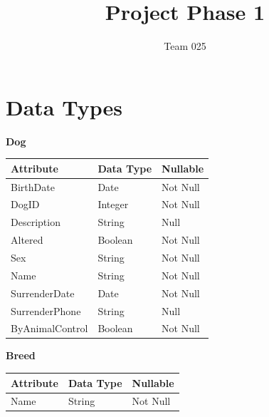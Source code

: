 \documentclass{article}
\title{Project Phase 1}
\author{Team 025}
\begin{document}
\maketitle
\tableofcontents
\newpage

\section{Data Types}

\noindent\textbf{Dog}
\begin{table}[H]
    \begin{tabular}{|l|l|l|}
    \hline
    \textbf{Attribute}         & \textbf{Data Type}                  & \textbf{Nullable} \\ \hline
    BirthDate                  & Date                                & Not Null          \\ \hline
    DogID                      & Integer                             & Not Null          \\ \hline
    Description                & String                              & Null              \\ \hline
    Altered                    & Boolean                             & Not Null          \\ \hline
    Sex                        & String                              & Not Null          \\ \hline
    Name                       & String                              & Not Null          \\ \hline
    SurrenderDate              & Date                                & Not Null          \\ \hline
    SurrenderPhone             & String                              & Null              \\ \hline
    ByAnimalControl            & Boolean                             & Not Null          \\ \hline
    \end{tabular}
\end{table}

\noindent \textbf{Breed}
\begin{table}[H]
    \begin{tabular}{|l|l|l|}
    \hline
    \textbf{Attribute}        & \textbf{Data Type} & \textbf{Nullable} \\ \hline
    Name                      & String             & Not Null          \\ \hline
    \end{tabular}
\end{table}
\end{document}
